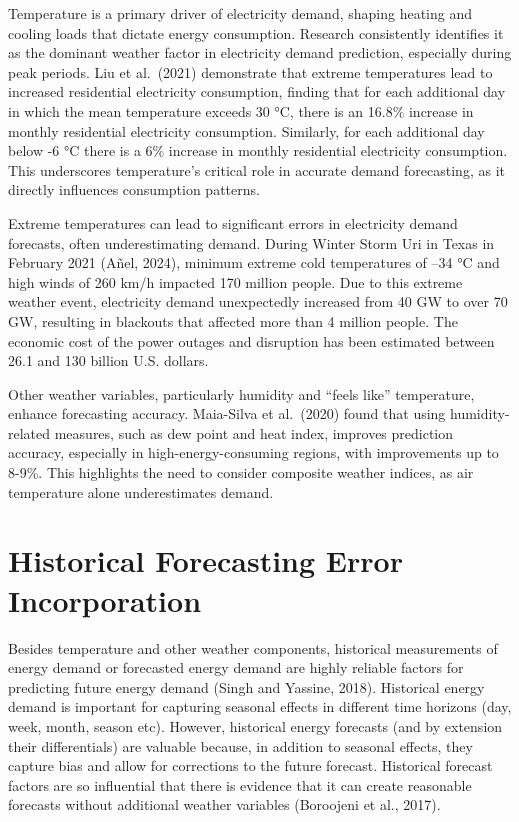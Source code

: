 \documentclass[mstat,12pt]{unswthesis}
\begin{document}
Temperature is a primary driver of electricity demand, shaping heating and cooling loads that dictate energy consumption. Research consistently identifies it as the dominant weather factor in electricity demand prediction, especially during peak periods. Liu et al.~(2021) demonstrate that extreme temperatures lead to increased residential electricity consumption, finding that for each additional day in which the mean temperature exceeds 30 °C, there is an 16.8\% increase in monthly residential electricity consumption. Similarly, for each additional day below -6 °C there is a 6\% increase in monthly residential electricity consumption. This underscores temperature's critical role in accurate demand forecasting, as it directly influences consumption patterns.

\bigskip

Extreme temperatures can lead to significant errors in electricity demand forecasts, often underestimating demand. During Winter Storm Uri in Texas in February 2021 (Añel, 2024), minimum extreme cold temperatures of --34 °C and high winds of 260 km/h impacted 170 million people. Due to this extreme weather event, electricity demand unexpectedly increased from 40 GW to over 70 GW, resulting in blackouts that affected more than 4 million people. The economic cost of the power outages and disruption has been estimated between 26.1 and 130 billion U.S. dollars.

\bigskip

Other weather variables, particularly humidity and ``feels like'' temperature, enhance forecasting accuracy. Maia-Silva et al.~(2020) found that using humidity-related measures, such as dew point and heat index, improves prediction accuracy, especially in high-energy-consuming regions, with improvements up to 8-9\%. This highlights the need to consider composite weather indices, as air temperature alone underestimates demand.

\section{Historical Forecasting Error Incorporation}\label{historical-forecasting-error-incorporation}

Besides temperature and other weather components, historical measurements of energy demand or forecasted energy demand are highly reliable factors for predicting future energy demand (Singh and Yassine, 2018). Historical energy demand is important for capturing seasonal effects in different time horizons (day, week, month, season etc). However, historical energy forecasts (and by extension their differentials) are valuable because, in addition to seasonal effects, they capture bias and allow for corrections to the future forecast. Historical forecast factors are so influential that there is evidence that it can create reasonable forecasts without additional weather variables (Boroojeni et al., 2017).
\end{document}
